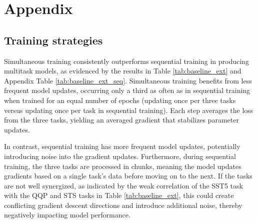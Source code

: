 \documentclass{article}
\begin{document}
\newpage



\newpage
\appendix
\renewcommand{\thefigure}{A\arabic{figure}}
\renewcommand{\thetable}{A\arabic{table}}
\setcounter{figure}{0}
\setcounter{table}{0}

\section{Appendix}
\subsection{Training strategies}
\label{sec:appdx_train_strategy}
Simultaneous training consistently outperforms sequential training in producing 
multitask models, as evidenced by the results in Table \ref{tab:baseline_ext} 
and Appendix Table \ref{tab:baseline_ext_seq}. 
Simultaneous training benefits from less frequent model updates, occurring only a third 
as often as in sequential training when trained for an equal number of epochs (updating
once per three tasks versus updating once per task in sequential training). 
Each step averages the loss from the three tasks, yielding an averaged gradient that
stabilizes parameter updates.

In contrast, sequential training has more frequent model 
updates, potentially introducing noise into the gradient updates. Furthermore, during 
sequential training, the three tasks are processed in chunks, meaning the model updates 
gradients based on a single task's data before moving on to the next. If the tasks are 
not well synergized, as indicated by the weak correlation of the SST5 task with the QQP 
and STS tasks in Table \ref{tab:baseline_ext}, this could create conflicting gradient 
descent directions and introduce additional noise, thereby negatively impacting model 
performance.
\end{document}
